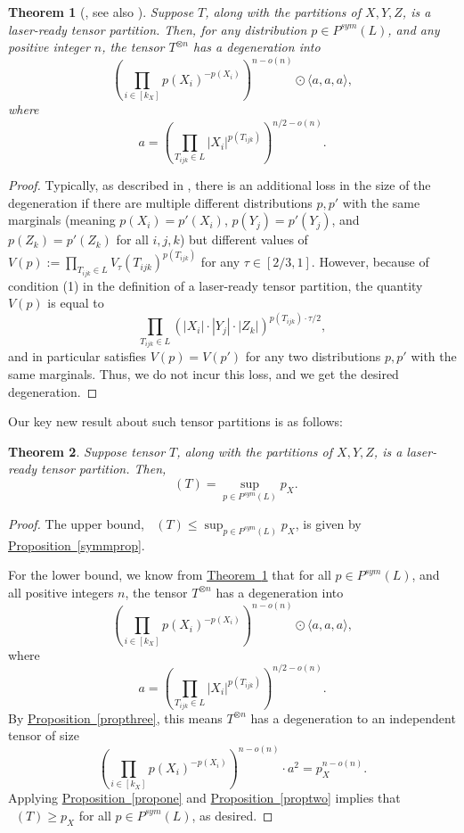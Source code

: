 \documentclass[11pt]{article}
\numberwithin{equation}{section}
\newtheorem{theorem}{Theorem}[section]
\theoremstyle{definition}
\theoremstyle{plain}
\newcommand{\expref}[2]{\hyperref[#2]{#1~\ref{#2}}}
\newcommand{\tsr}{\mathop{\tilde{\operatorname{S}}}}
\theoremstyle{definition}
\begin{document}
\begin{theorem}[{\cite{coppersmith,stothers,v12}, see also \cite[{Proposition~15.32}]{burgisser2013algebraic}}] \label{laserthm}
Suppose $T$, along with the partitions of $X,Y,Z$, is a laser-ready tensor partition. Then, for any distribution $p\in P^{sym}(L)$, and any positive integer $n$, the tensor $T^{\otimes n}$ has a degeneration into $$\left(\prod_{i \in [k_X]} p(X_i)^{-p(X_i)}\right)^{n - o(n)} \odot \langle a,a,a \rangle,$$
where 
$$a = \left( \prod_{T_{ijk} \in L} |X_i| ^{p(T_{ijk})} \right)^{n/2 - o(n)}.$$
\end{theorem}

\begin{proof}
Typically, as described in \cite[Section~3]{v12}, there is an additional loss in the size of the degeneration if there are multiple different distributions $p, p'$ with the same marginals (meaning $p(X_i) = p'(X_i)$, $p(Y_j) = p'(Y_j)$, and $p(Z_k) = p'(Z_k)$ for all $i,j,k$) but different values of $V(p) := \prod_{T_{ijk} \in L} V_{\tau}(T_{ijk})^{p(T_{ijk})}$ for any $\tau \in [2/3, 1]$. However, because of condition (1) in the definition of a laser-ready tensor partition, the quantity $V(p)$ is equal to 
$$ \prod_{T_{ijk} \in L} (|X_i| \cdot |Y_j| \cdot |Z_k|)^{p(T_{ijk})\cdot \tau /2},$$
and in particular satisfies $V(p) = V(p')$ for any two distributions $p,p'$ with the same marginals. Thus, we do not incur this loss, and we get the desired degeneration. 
\end{proof}

Our key new result about such tensor partitions is as follows:


\begin{theorem}\label{thmlaseropt}
Suppose tensor $T$, along with the partitions of $X,Y,Z$, is a laser-ready tensor partition. Then, $$\tsr(T) = \sup_{p \in P^{sym}(L)} p_X.$$
\end{theorem}


\begin{proof}
The upper bound, $\tsr(T) \leq \sup_{p \in P^{sym}(L)} p_X$, is given by \expref{Proposition}{symmprop}.

For the lower bound, we know from \expref{Theorem}{laserthm} that for all $p \in P^{sym}(L)$, and all positive integers $n$, the tensor $T^{\otimes n}$ has a degeneration into $$\left(\prod_{i \in [k_X]} p(X_i)^{-p(X_i)}\right)^{n - o(n)} \odot \langle a,a,a \rangle,$$
where 
$$a = \left( \prod_{T_{ijk} \in L} |X_i| ^{p(T_{ijk})} \right)^{n/2 - o(n)}.$$
By \expref{Proposition}{propthree}, this means $T^{\otimes n}$ has a degeneration to an independent tensor of size
$$\left(\prod_{i \in [k_X]} p(X_i)^{-p(X_i)}\right)^{n - o(n)} \cdot a^2 = p_X^{n - o(n)}.$$
Applying \expref{Proposition}{propone} and \expref{Proposition}{proptwo} implies that $\tsr(T) \geq p_X$ for all $p \in P^{sym}(L)$, as desired.
\end{proof}
\end{document}
